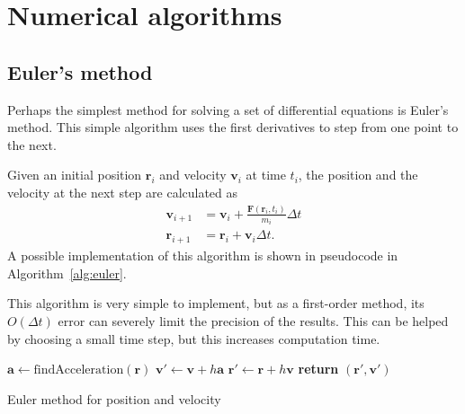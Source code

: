 \documentclass[aps,prc,reprint,nobalancelastpage]{revtex4-1}
\begin{document}
\section{Numerical algorithms}
\label{sec:algorithms}

    \subsection{Euler's method}
    \label{sub:euler}

        Perhaps the simplest method for solving a set of differential equations is Euler's method. This simple algorithm uses the first derivatives to step from one point to the next.

        Given an initial position $\mathbf{r}_i$ and velocity $\mathbf{v}_i$ at time $t_i$, the position and the velocity at the next step are calculated as \cite{Hjorth-Jensen2016}
        \begin{align}
            \mathbf{v}_{i+1} &= \mathbf{v}_i + \frac{\mathbf{F}(\mathbf{r}_i, t_i)}{m_i} \Delta t \\
            \mathbf{r}_{i+1} &= \mathbf{r}_i + \mathbf{v}_i \Delta t.
        \end{align}
        A possible implementation of this algorithm is shown in pseudocode in Algorithm~\ref{alg:euler}.

        This algorithm is very simple to implement, but as a first-order method, its $O(\Delta t)$ error can severely limit the precision of the results. This can be helped by choosing a small time step, but this increases computation time.

            \begin{algorithm}[H]
                \begin{algorithmic}
                        \State $\mathbf{a} \gets \text{findAcceleration}(\mathbf{r})$
                        \State $\mathbf{v}' \gets \mathbf{v} + h \mathbf{a}$
                        \State $\mathbf{r}' \gets \mathbf{r} + h \mathbf{v}$
                        \State \textbf{return} $(\mathbf{r}', \mathbf{v}')$
                    \EndFunction
                \end{algorithmic}
                \caption{Euler method for position and velocity}
                \label{alg:euler}
            \end{algorithm}
\end{document}
